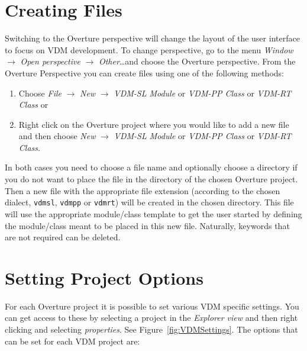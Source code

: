 \documentclass{overturerepchap}
\begin{document}

\section{Creating Files}

Switching to the Overture perspective will change the layout of the user
interface to focus on VDM development. To change perspective, go to the menu 
\emph{Window} $\rightarrow$ \emph{Open perspective} $\rightarrow$
\emph{Other}\ldots and choose the Overture perspective.
From the Overture Perspective you can create files
using one of the following methods:

\begin{enumerate}
  \item Choose \emph{File} $\rightarrow$ \emph{New} $\rightarrow$
    \emph{VDM-SL Module} or 
    \emph{VDM-PP Class} or 
    \emph{VDM-RT Class} or
  \item Right click on the Overture project where you would like to
    add a new file and then choose \emph{New} $\rightarrow$ 
    \emph{VDM-SL Module} or \emph{VDM-PP Class} or \emph{VDM-RT Class}.
\end{enumerate}

In both cases you need to choose a file name and optionally choose a
directory if you do not want to place the file in the directory of
the chosen Overture project. Then a new file with the appropriate file
extension (according to the chosen dialect, \texttt{vdmsl},
\texttt{vdmpp} or \texttt{vdmrt}) will be
created in the chosen directory. This file will use the appropriate
module/class template to get the user started by defining the
module/class meant to be placed in this new file. Naturally, keywords 
that are not required can be deleted.

\section{Setting Project Options}\label{subsec:options}

For each Overture project it is possible to set various VDM
specific settings. You can get access to these by selecting a project
in the \emph{Explorer view} and then right clicking and selecting
\emph{properties}. See Figure~\ref{fig:VDMSettings}. The options 
that can be set for each VDM project are:
\end{document}
